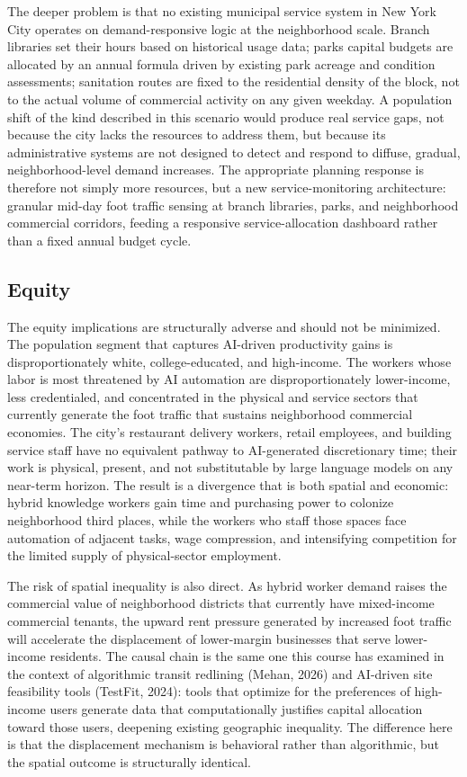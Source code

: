 \documentclass[10pt, twocolumn]{article}
\begin{document}
The deeper problem is that no existing municipal service system in New York City operates on demand-responsive logic at the neighborhood scale. Branch libraries set their hours based on historical usage data; parks capital budgets are allocated by an annual formula driven by existing park acreage and condition assessments; sanitation routes are fixed to the residential density of the block, not to the actual volume of commercial activity on any given weekday. A population shift of the kind described in this scenario would produce real service gaps, not because the city lacks the resources to address them, but because its administrative systems are not designed to detect and respond to diffuse, gradual, neighborhood-level demand increases. The appropriate planning response is therefore not simply more resources, but a new service-monitoring architecture: granular mid-day foot traffic sensing at branch libraries, parks, and neighborhood commercial corridors, feeding a responsive service-allocation dashboard rather than a fixed annual budget cycle.

\subsection*{Equity}

The equity implications are structurally adverse and should not be minimized. The population segment that captures AI-driven productivity gains is disproportionately white, college-educated, and high-income. The workers whose labor is most threatened by AI automation are disproportionately lower-income, less credentialed, and concentrated in the physical and service sectors that currently generate the foot traffic that sustains neighborhood commercial economies. The city's restaurant delivery workers, retail employees, and building service staff have no equivalent pathway to AI-generated discretionary time; their work is physical, present, and not substitutable by large language models on any near-term horizon. The result is a divergence that is both spatial and economic: hybrid knowledge workers gain time and purchasing power to colonize neighborhood third places, while the workers who staff those spaces face automation of adjacent tasks, wage compression, and intensifying competition for the limited supply of physical-sector employment.

The risk of spatial inequality is also direct. As hybrid worker demand raises the commercial value of neighborhood districts that currently have mixed-income commercial tenants, the upward rent pressure generated by increased foot traffic will accelerate the displacement of lower-margin businesses that serve lower-income residents. The causal chain is the same one this course has examined in the context of algorithmic transit redlining (Mehan, 2026) and AI-driven site feasibility tools (TestFit, 2024): tools that optimize for the preferences of high-income users generate data that computationally justifies capital allocation toward those users, deepening existing geographic inequality. The difference here is that the displacement mechanism is behavioral rather than algorithmic, but the spatial outcome is structurally identical.
\end{document}
